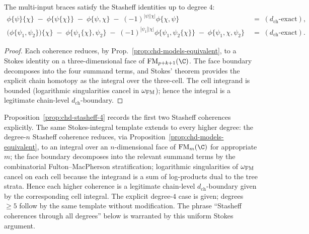 \begin{proposition}%
\label{prop:chd-stasheff-4}%
%
The multi-input braces satisfy the Stasheff identities up to degree $4$:
\begin{align}
 \phi\{\psi\}\{\chi\} \;-\; \phi\{\psi\{\chi\}\} \;-\;
 \phi\{\psi,\chi\} \;-\; (-1)^{|\psi||\chi|}\phi\{\chi,\psi\}
 \;&=\; (d_{\mathrm{ch}}\text{-exact}), \\
 \bigl(\phi\{\psi_1,\psi_2\}\bigr)\{\chi\} \;-\;
 \phi\{\psi_1\{\chi\},\psi_2\} \;-\;
 (-1)^{|\psi_1||\chi|} \phi\{\psi_1,\psi_2\{\chi\}\}
 \;-\; \phi\{\psi_1,\chi,\psi_2\} \;&=\; (d_{\mathrm{ch}}\text{-exact}).
\end{align}
\end{proposition}

\begin{proof}
Each coherence reduces, by Prop.~\ref{prop:chd-models-equivalent}, to
a Stokes identity on a three-dimensional face of
$\FM_{p+k+1}(\C)$. The face boundary decomposes into the four summand
terms, and Stokes' theorem provides the explicit chain homotopy as
the integral over the three-cell. The cell integrand is bounded
(logarithmic singularities cancel in $\omega_{\mathrm{FM}}$); hence the
integral is a legitimate chain-level $d_{\mathrm{ch}}$-boundary.
\end{proof}

\begin{remark}%
\label{rem:chd-stasheff-higher-degree}%
%
Proposition~\ref{prop:chd-stasheff-4} records the first two Stasheff
coherences explicitly. The same Stokes-integral template extends to
every higher degree: the degree-$n$ Stasheff coherence reduces, via
Proposition~\ref{prop:chd-models-equivalent}, to an integral over an
$n$-dimensional face of $\FM_{m}(\C)$ for appropriate $m$; the face
boundary decomposes into the relevant summand terms by the
combinatorial Fulton--MacPherson stratification; logarithmic
singularities of $\omega_{\mathrm{FM}}$ cancel on each cell because the
integrand is a sum of log-products dual to the tree strata. Hence
each higher coherence is a legitimate chain-level
$d_{\mathrm{ch}}$-boundary given by the corresponding cell integral.
The explicit degree-$4$ case is given; degrees $\geq 5$ follow
by the same template without modification. The phrase ``Stasheff
coherences through all degrees'' below is warranted by this
uniform Stokes argument.
\end{remark}

